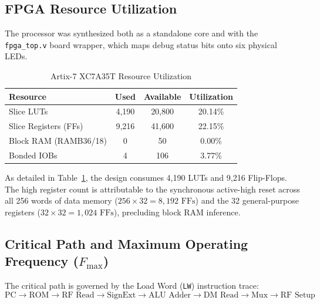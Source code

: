 \documentclass[conference]{IEEEtran}
\begin{document}
\subsection{FPGA Resource Utilization}
The processor was synthesized both as a standalone core and with the \texttt{fpga_top.v} board wrapper, which maps debug status bits onto six physical LEDs.

\begin{table}[htbp]
\caption{Artix-7 XC7A35T Resource Utilization}
\label{tab:synthesis}
\begin{center}
\begin{tabular}{lccc}
\toprule
\textbf{Resource} & \textbf{Used} & \textbf{Available} & \textbf{Utilization} \\
\midrule
Slice LUTs & 4,190 & 20,800 & 20.14\% \\
Slice Registers (FFs) & 9,216 & 41,600 & 22.15\% \\
Block RAM (RAMB36/18) & 0 & 50 & 0.00\% \\
Bonded IOBs & 4 & 106 & 3.77\% \\
\bottomrule
\end{tabular}
\end{center}
\end{table}

As detailed in Table~\ref{tab:synthesis}, the design consumes 4,190 LUTs and 9,216 Flip-Flops. The high register count is attributable to the synchronous active-high reset across all 256 words of data memory ($256 \times 32 = 8,192\text{ FFs}$) and the 32 general-purpose registers ($32 \times 32 = 1,024\text{ FFs}$), precluding block RAM inference.

\subsection{Critical Path and Maximum Operating Frequency ($F_{\max}$)}
The critical path is governed by the Load Word (\texttt{LW}) instruction trace:
\begin{equation*}
\text{PC} \to \text{ROM} \to \text{RF Read} \to \text{SignExt} \to \text{ALU Adder} \to \text{DM Read} \to \text{Mux} \to \text{RF Setup}
\end{equation*}
\end{document}
